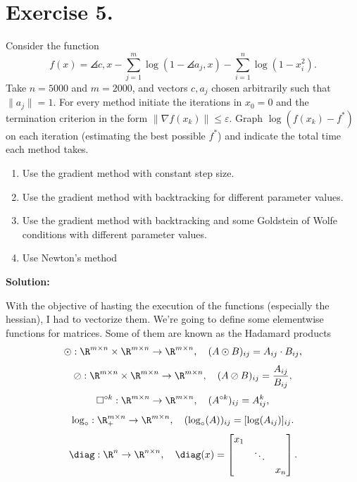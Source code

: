 \section*{Exercise 5.}

Consider the function
\[ f(x) = \angles{c,x} - \sum_{j = 1}^m \log(1-\angles{a_j,x}) - \sum_{i = 1}^n \log(1-x_i^2). \]
Take $n = 5000$ and $m = 2000$, and vectors $c,a_j$ chosen arbitrarily such that $\|a_j\| = 1$. For every method initiate the iterations in $x_0 = 0$ and the termination criterion in the form $\|\nabla f(x_k)\| \leq \varepsilon$. Graph $\log(f(x_k)-f^*)$ on each iteration (estimating the best possible $f^*$) and indicate the total time each method takes.

\begin{enumerate}[label=\alph*)]
    \item Use the gradient method with constant step size.
    \item Use the gradient method with backtracking for different parameter values.
    \item Use the gradient method with backtracking and some Goldstein of Wolfe conditions with different parameter values.
    \item Use Newton's method
\end{enumerate}

\textbf{Solution:}

With the objective of hasting the execution of the functions (especially the hessian), I had to vectorize them. We're going to define some elementwise functions for matrices. Some of them are known as the Hadamard products
\[ \odot: \R^{m\times n} \times \R^{m\times n} \to \R^{m\times n},\hspace{1em} (A\odot B)_{ij} = A_{ij}\cdot B_{ij}, \]
\[ \oslash: \R^{m\times n} \times \R^{m\times n} \to \R^{m\times n},\hspace{1em} (A\oslash B)_{ij} = \frac{A_{ij}}{B_{ij}}, \]
\[ \square^{\circ k}: \R^{m\times n} \to \R^{m\times n},\hspace{1em} (A^{\circ k})_{ij} = A_{ij}^k, \]
\[ \log_\circ: \R^{m\times n}_+ \to \R^{m\times n}, \hspace{1em} (\log_\circ(A))_{ij} = [\log(A_{ij})]_{ij}.\]
\[ \diag: \R^{n} \to \R^{n\times n}, \hspace{1em} \diag(x) = \left[ \begin{matrix}
    x_1 & & \\
    & \ddots & \\
    & & x_n
\end{matrix} \right].\]


